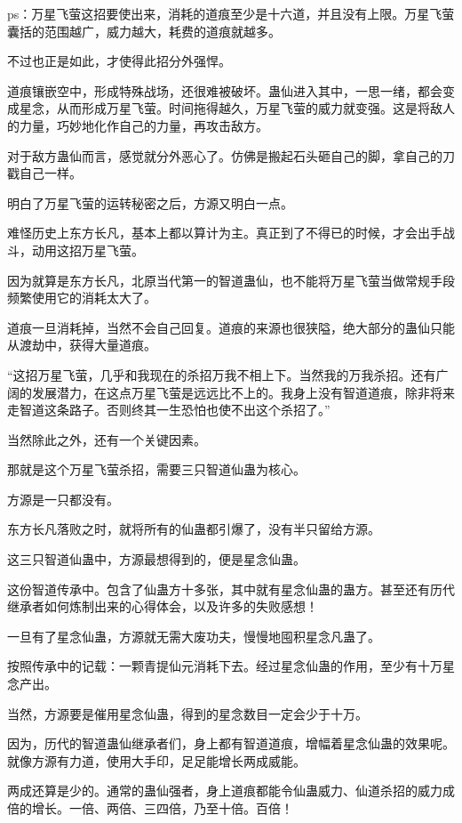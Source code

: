 
\begin{this_body}

ps：万星飞萤这招要使出来，消耗的道痕至少是十六道，并且没有上限。万星飞萤囊括的范围越广，威力越大，耗费的道痕就越多。

不过也正是如此，才使得此招分外强悍。

道痕镶嵌空中，形成特殊战场，还很难被破坏。蛊仙进入其中，一思一绪，都会变成星念，从而形成万星飞萤。时间拖得越久，万星飞萤的威力就变强。这是将敌人的力量，巧妙地化作自己的力量，再攻击敌方。

对于敌方蛊仙而言，感觉就分外恶心了。仿佛是搬起石头砸自己的脚，拿自己的刀戳自己一样。

明白了万星飞萤的运转秘密之后，方源又明白一点。

难怪历史上东方长凡，基本上都以算计为主。真正到了不得已的时候，才会出手战斗，动用这招万星飞萤。

因为就算是东方长凡，北原当代第一的智道蛊仙，也不能将万星飞萤当做常规手段频繁使用它的消耗太大了。

道痕一旦消耗掉，当然不会自己回复。道痕的来源也很狭隘，绝大部分的蛊仙只能从渡劫中，获得大量道痕。

“这招万星飞萤，几乎和我现在的杀招万我不相上下。当然我的万我杀招。还有广阔的发展潜力，在这点万星飞萤是远远比不上的。我身上没有智道道痕，除非将来走智道这条路子。否则终其一生恐怕也使不出这个杀招了。”

当然除此之外，还有一个关键因素。

那就是这个万星飞萤杀招，需要三只智道仙蛊为核心。

方源是一只都没有。

东方长凡落败之时，就将所有的仙蛊都引爆了，没有半只留给方源。

这三只智道仙蛊中，方源最想得到的，便是星念仙蛊。

这份智道传承中。包含了仙蛊方十多张，其中就有星念仙蛊的蛊方。甚至还有历代继承者如何炼制出来的心得体会，以及许多的失败感想！

一旦有了星念仙蛊，方源就无需大废功夫，慢慢地囤积星念凡蛊了。

按照传承中的记载：一颗青提仙元消耗下去。经过星念仙蛊的作用，至少有十万星念产出。

当然，方源要是催用星念仙蛊，得到的星念数目一定会少于十万。

因为，历代的智道蛊仙继承者们，身上都有智道道痕，增幅着星念仙蛊的效果呢。就像方源有力道，使用大手印，足足能增长两成威能。

两成还算是少的。通常的蛊仙强者，身上道痕都能令仙蛊威力、仙道杀招的威力成倍的增长。一倍、两倍、三四倍，乃至十倍。百倍！


\end{this_body}

